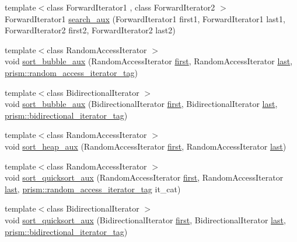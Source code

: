 \begin{DoxyCompactItemize}
\item 
{\footnotesize template$<$class Forward\+Iterator1 , class Forward\+Iterator2 $>$ }\\Forward\+Iterator1 \hyperlink{namespaceprism_ab6f8ed8b450ff281e02218e10d5643a7}{search\+\_\+aux} (Forward\+Iterator1 first1, Forward\+Iterator1 last1, Forward\+Iterator2 first2, Forward\+Iterator2 last2)
\item 
{\footnotesize template$<$class Random\+Access\+Iterator $>$ }\\void \hyperlink{namespaceprism_a1e22fc5d6e1e94cf7d9d76cee8dcb281}{sort\+\_\+bubble\+\_\+aux} (Random\+Access\+Iterator \hyperlink{namespaceprism_ae3fb7a1926a9e8e59300cd5e370470da}{first}, Random\+Access\+Iterator \hyperlink{namespaceprism_abe4956c4e865f55ca126b7fb973b5078}{last}, \hyperlink{structprism_1_1random__access__iterator__tag}{prism\+::random\+\_\+access\+\_\+iterator\+\_\+tag})
\item 
{\footnotesize template$<$class Bidirectional\+Iterator $>$ }\\void \hyperlink{namespaceprism_a8132b98c9ee1d630059074e1779341b2}{sort\+\_\+bubble\+\_\+aux} (Bidirectional\+Iterator \hyperlink{namespaceprism_ae3fb7a1926a9e8e59300cd5e370470da}{first}, Bidirectional\+Iterator \hyperlink{namespaceprism_abe4956c4e865f55ca126b7fb973b5078}{last}, \hyperlink{structprism_1_1bidirectional__iterator__tag}{prism\+::bidirectional\+\_\+iterator\+\_\+tag})
\item 
{\footnotesize template$<$class Random\+Access\+Iterator $>$ }\\void \hyperlink{namespaceprism_ab289bdf7cde130b0aeea21a9711770f4}{sort\+\_\+heap\+\_\+aux} (Random\+Access\+Iterator \hyperlink{namespaceprism_ae3fb7a1926a9e8e59300cd5e370470da}{first}, Random\+Access\+Iterator \hyperlink{namespaceprism_abe4956c4e865f55ca126b7fb973b5078}{last})
\item 
{\footnotesize template$<$class Random\+Access\+Iterator $>$ }\\void \hyperlink{namespaceprism_ae5aebde51f8677c6608cf202e02eac6c}{sort\+\_\+quicksort\+\_\+aux} (Random\+Access\+Iterator \hyperlink{namespaceprism_ae3fb7a1926a9e8e59300cd5e370470da}{first}, Random\+Access\+Iterator \hyperlink{namespaceprism_abe4956c4e865f55ca126b7fb973b5078}{last}, \hyperlink{structprism_1_1random__access__iterator__tag}{prism\+::random\+\_\+access\+\_\+iterator\+\_\+tag} it\+\_\+cat)
\item 
{\footnotesize template$<$class Bidirectional\+Iterator $>$ }\\void \hyperlink{namespaceprism_a49b96350afdd8de11aac6b0c74f78c99}{sort\+\_\+quicksort\+\_\+aux} (Bidirectional\+Iterator \hyperlink{namespaceprism_ae3fb7a1926a9e8e59300cd5e370470da}{first}, Bidirectional\+Iterator \hyperlink{namespaceprism_abe4956c4e865f55ca126b7fb973b5078}{last}, \hyperlink{structprism_1_1bidirectional__iterator__tag}{prism\+::bidirectional\+\_\+iterator\+\_\+tag})

\end{DoxyCompactItemize}
